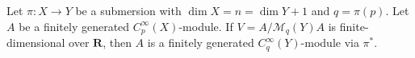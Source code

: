 Let $\pi: X \to Y$ be a submersion with $\dim X = n = \dim Y + 1$ and $q = \pi(p)$. Let $A$ be a finitely generated $C_p^\infty(X)$-module. If $V = A/\mathcal{M}_q(Y)A$ is finite-dimensional over $\mathbf{R}$, then $A$ is a finitely generated $C_q^\infty(Y)$-module via $\pi^*$.
